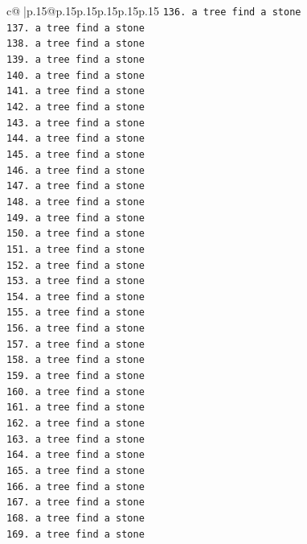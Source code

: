 \documentclass{article}
\begin{document}
{\begin{supertabular}{c@{$\;$}|p{.15\linewidth}@{}p{.15\linewidth}p{.15\linewidth}p{.15\linewidth}p{.15\linewidth}p{.15\linewidth}}
{{{\texttt{136. a tree find a stone} \\
\texttt{137. a tree find a stone} \\
\texttt{138. a tree find a stone} \\
\texttt{139. a tree find a stone} \\
\texttt{140. a tree find a stone} \\
\texttt{141. a tree find a stone} \\
\texttt{142. a tree find a stone} \\
\texttt{143. a tree find a stone} \\
\texttt{144. a tree find a stone} \\
\texttt{145. a tree find a stone} \\
\texttt{146. a tree find a stone} \\
\texttt{147. a tree find a stone} \\
\texttt{148. a tree find a stone} \\
\texttt{149. a tree find a stone} \\
\texttt{150. a tree find a stone} \\
\texttt{151. a tree find a stone} \\
\texttt{152. a tree find a stone} \\
\texttt{153. a tree find a stone} \\
\texttt{154. a tree find a stone} \\
\texttt{155. a tree find a stone} \\
\texttt{156. a tree find a stone} \\
\texttt{157. a tree find a stone} \\
\texttt{158. a tree find a stone} \\
\texttt{159. a tree find a stone} \\
\texttt{160. a tree find a stone} \\
\texttt{161. a tree find a stone} \\
\texttt{162. a tree find a stone} \\
\texttt{163. a tree find a stone} \\
\texttt{164. a tree find a stone} \\
\texttt{165. a tree find a stone} \\
\texttt{166. a tree find a stone} \\
\texttt{167. a tree find a stone} \\
\texttt{168. a tree find a stone} \\
\texttt{169. a tree find a stone} \\
}}}
\end{supertabular}}
\end{document}
